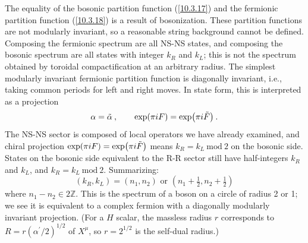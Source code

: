 	The equality of the bosonic partition function (\ref{10.3.17}) and the fermionic partition function (\ref{10.3.18}) is a result of bosonization. These partition functions are not modularly invariant, so a reasonable string background cannot be defined. Composing the fermionic spectrum are all NS-NS states, and composing the bosonic spectrum are all states with integer $k_{R}$ and $k_{L}$; this is not the spectrum obtained by toroidal compactification at an arbitrary radius. The simplest modularly invariant fermionic partition function is diagonally invariant, i.e., taking common periods for left and right moves. In state form, this is interpreted as a projection
	\begin{equation}
		\alpha=\tilde{\alpha}\:, \qquad \exp(\pi i F)=\exp(\pi i\tilde{F})\:.\label{10.7.17}
	\end{equation}
	The NS-NS sector is composed of local operators we have already examined, and chiral projection $\exp(\pi i F)=\exp(\pi i\tilde{F})$ means $k_{R}=k_{L}\:\mathrm{mod}\: 2$ on the bosonic side. States on the bosonic side equivalent to the R-R sector still have half-integers $k_{R}$ and $k_{L}$, and $k_{R}=k_{L}\:\mathrm{mod}\: 2$. Summarizing:
	\begin{equation}
		(k_{R},k_{L})=(n_{1},n_{2})\text{ or }(n_{1}+\tfrac{1}{2},n_{2}+\tfrac{1}{2}) \label{10.7.18}
	\end{equation}
	where $n_{1}-n_{2}\in 2\mathds{Z}$. This is the spectrum of a boson on a circle of radius 2 or 1; we see it is equivalent to a complex fermion with a diagonally modularly invariant projection. (For a $H$ scalar, the massless radius $r$ corresponds to $R=r(\alpha^{\prime}/2)^{1/2}$ of $X^{\mu}$, so $r=2^{1/2}$ is the self-dual radius.)
